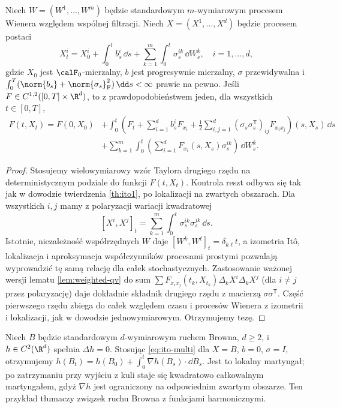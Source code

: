 \begin{twierdzenie}
\label{th:ito-multi}
Niech $W=(W^1,\ldots,W^m)$ będzie standardowym
$m$-wymiarowym procesem Wienera względem wspólnej
filtracji. Niech $X=(X^1,\ldots,X^d)$ będzie procesem
postaci
\[
X_t^i=X_0^i+\int_0^t b_s^i\,\dd s
+\sum_{k=1}^{m}\int_0^t\sigma_s^{ik}\,\dd W_s^k,
\quad i=1,\ldots,d,
\]
gdzie $X_0$ jest $\calF_0$-mierzalny, $b$ jest
progresywnie mierzalny, $\sigma$ przewidywalna i
$\int_0^T(\norm{b_s}+\norm{\sigma_s}_{\mathrm F}^2)\,\dd s
<\infty$ prawie na pewno. Jeśli
$F\in C^{1,2}([0,T]\times\R^d)$, to z prawdopodobieństwem
jeden, dla wszystkich $t\in[0,T]$,
\[
\begin{split}
F(t,X_t)=F(0,X_0)&+\int_0^t\left(
F_t+\sum_{i=1}^d b_s^iF_{x_i}
+\frac12\sum_{i,j=1}^d(\sigma_s\sigma_s^{\mathsf T})_{ij}
F_{x_ix_j}\right)(s,X_s)\,\dd s\\
&+\sum_{k=1}^m\int_0^t
\left(\sum_{i=1}^dF_{x_i}(s,X_s)\sigma_s^{ik}\right)
\,\dd W_s^k.
\end{split}
\tag{3.6}\label{eq:ito-multi}
\]
\end{twierdzenie}
\begin{proof}
Stosujemy wielowymiarowy wzór Taylora drugiego rzędu
na deterministycznym podziale do funkcji $F(t,X_t)$.
Kontrola reszt odbywa się tak jak w dowodzie twierdzenia
\ref{th:ito1}, po lokalizacji na zwartych obszarach.
Dla wszystkich $i,j$ mamy z polaryzacji wariacji
kwadratowej
\[
[X^i,X^j]_t
=\sum_{k=1}^m\int_0^t\sigma_s^{ik}\sigma_s^{jk}\,\dd s.
\]
Istotnie, niezależność współrzędnych $W$ daje
$[W^k,W^\ell]_t=\delta_{k\ell}t$, a izometria Itô,
lokalizacja i aproksymacja współczynników procesami
prostymi pozwalają wyprowadzić tę samą relację dla
całek stochastycznych. Zastosowanie ważonej wersji
lematu \ref{lem:weighted-qv} do sum
$\sum F_{x_ix_j}(t_k,X_{t_k})\Delta_kX^i\Delta_kX^j$
(dla $i\ne j$ przez polaryzację) daje dokładnie
składnik drugiego rzędu z macierzą $\sigma\sigma^{\mathsf T}$.
Część pierwszego rzędu zbiega do całek względem czasu
i procesów Wienera z izometrii i lokalizacji, jak w
dowodzie jednowymiarowym. Otrzymujemy tezę.
\end{proof}

\begin{przyklad}
Niech $B$ będzie standardowym $d$-wymiarowym ruchem
Browna, $d\ge2$, i $h\in C^2(\R^d)$ spełnia
$\Delta h=0$. Stosując \eqref{eq:ito-multi} dla
$X=B$, $b=0$, $\sigma=I$, otrzymujemy
$h(B_t)=h(B_0)+\int_0^t\nabla h(B_s)\cdot\dd B_s$.
Jest to lokalny martyngał; po zatrzymaniu przy wyjściu
z kuli staje się kwadratowo całkowalnym martyngałem,
gdyż $\nabla h$ jest ograniczony na odpowiednim
zwartym obszarze. Ten przykład tłumaczy związek
ruchu Browna z funkcjami harmonicznymi.
\end{przyklad}

